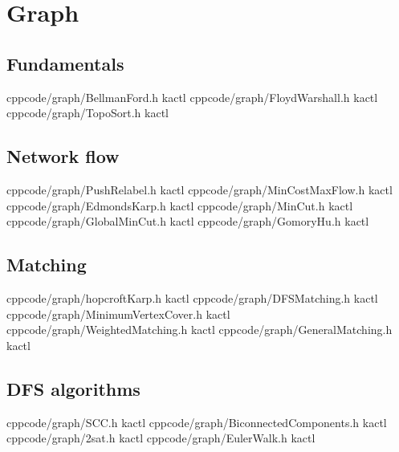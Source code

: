 \chapter{Graph}

\section{Fundamentals}
    {}{}
    {cpp}{code/graph/BellmanFord.h}
    {kactl}
    {}{}
    {cpp}{code/graph/FloydWarshall.h}
    {kactl}
    {}{}
    {cpp}{code/graph/TopoSort.h}
    {kactl}

\section{Network flow}
    {}{}
    {cpp}{code/graph/PushRelabel.h}
    {kactl}
    {}{}
    {cpp}{code/graph/MinCostMaxFlow.h}
    {kactl}
    {}{}
    {cpp}{code/graph/EdmondsKarp.h}
    {kactl}
    {}{}
    {cpp}{code/graph/MinCut.h}
    {kactl}
    {}{}
    {cpp}{code/graph/GlobalMinCut.h}
    {kactl}
    {}{}
    {cpp}{code/graph/GomoryHu.h}
    {kactl}

\section{Matching}
    {}{}
    {cpp}{code/graph/hopcroftKarp.h}
    {kactl}
    {}{}
    {cpp}{code/graph/DFSMatching.h}
    {kactl}
    {}{}
    {cpp}{code/graph/MinimumVertexCover.h}
    {kactl}
    {}{}
    {cpp}{code/graph/WeightedMatching.h}
    {kactl}
    {}{}
    {cpp}{code/graph/GeneralMatching.h}
    {kactl}

\section{DFS algorithms}
    {}{}
    {cpp}{code/graph/SCC.h}
    {kactl}
    {}{}
    {cpp}{code/graph/BiconnectedComponents.h}
    {kactl}
    {}{}
    {cpp}{code/graph/2sat.h}
    {kactl}
    {}{}
    {cpp}{code/graph/EulerWalk.h}
    {kactl}

